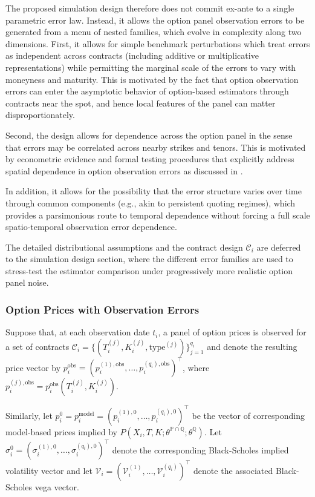 \documentclass[11pt,a4paper,notitlepage]{article}
\numberwithin{equation}{section}
\begin{document}
The proposed simulation design therefore does not commit ex-ante to a single parametric error law.
Instead, it allows the option panel observation errors to be generated from a menu of nested families, which evolve in complexity along two dimensions. First, it allows for simple benchmark perturbations which treat errors as independent across contracts (including additive or multiplicative representations) while permitting the marginal scale of the errors to vary with moneyness and maturity. This is motivated by the fact that option observation errors
can enter the asymptotic behavior of option-based estimators through contracts near the spot, and hence local
features of the panel can matter disproportionately. \citet{chongtodorov2024vov}

Second, the design allows for dependence across the option panel in the sense that errors may be correlated across nearby strikes and tenors. This is motivated by econometric evidence and formal testing procedures that explicitly address spatial dependence in option observation errors as discussed in \citet{andersen2021spatial}.

In addition, it allows for the possibility that the error structure varies over time through  common components (e.g., akin to persistent quoting regimes), which provides a parsimonious route to temporal dependence without forcing a full scale spatio-temporal observation error dependence.

The detailed distributional assumptions and the contract design $\mathcal{C}_i$ are deferred to the simulation design section, where the different error families are used to stress-test the estimator comparison under progressively more realistic option panel noise.

\subsubsection{Option Prices with Observation Errors}
Suppose that, at each observation date $t_i$, a panel of option prices is observed for a set of contracts
$\mathcal{C}_i=\{(T_i^{(j)},K_i^{(j)},\mathrm{type}^{(j)})\}_{j=1}^{q_i}$ and denote the resulting price vector by
$p_i^{\mathrm{obs}}=\left(p_i^{(1),\mathrm{obs}},\dots,p_i^{(q_i),\mathrm{obs}}\right)^\top$, where
$p_i^{(j),\mathrm{obs}}=p_i^{\mathrm{obs}}(T_i^{(j)},K_i^{(j)})$.

Similarly, let
$p_i^{0}=p_i^{\mathrm{model}}=\left(p_i^{(1),0},\dots,p_i^{(q_i),0}\right)^\top$
be the vector of corresponding model-based prices implied by
$P(X_i,T,K;\theta^{\mathbb{P}\cap\mathbb{Q}};\theta^\mathbb{Q})$.
Let $\sigma_i^{0}=\left(\sigma_i^{(1),0},\dots,\sigma_i^{(q_i),0}\right)^\top$
denote the corresponding Black-Scholes implied volatility vector and let
$\mathcal{V}_i=\left(\mathcal{V}_i^{(1)},\dots,\mathcal{V}_i^{(q_i)}\right)^\top$
denote the associated Black-Scholes vega vector.
\end{document}
